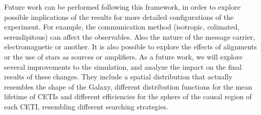 \documentclass[crop]{CSLB}%
\begin{document}
Future work can be performed following this framework, in order to
explore possible implications of the results for more detailed 
configurations of the experiment.
%
For example, the communication method (isotropic, colimated,
serendipitous) can affect the observables.
%
Also the nature of the message carrier, electromagnetic or another.
%
It is also possible to explore the effects of alignments or the use of
stars as sources or amplifiers.
%
%
As a future work, we will explore several improvements to the
simulation, and analyze the impact on the final results of these
changes.
%
They include a spatial distribution that actually resembles the shape
of the Galaxy, different distribution functions for the mean lifetime
of CETIs and different efficiencies for the sphere of the causal
region of each CETI, resembling different searching strategies.
 





\end{document}
